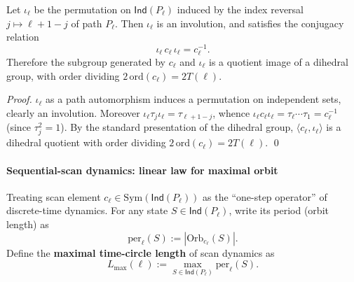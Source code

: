 \begin{corollary}\label{cor:pom-toggle-dihedral-time-reversal}
Let \(\iota_{\ell}\) be the permutation on \(\mathsf{Ind}(P_\ell)\) induced by the index reversal \(j\mapsto \ell+1-j\) of path \(P_{\ell}\).
Then \(\iota_{\ell}\) is an involution, and satisfies the conjugacy relation
\[
\iota_{\ell}\,c_{\ell}\,\iota_{\ell}=c_{\ell}^{-1}.
\]
Therefore the subgroup generated by \(c_\ell\) and \(\iota_\ell\) is a quotient image of a dihedral group, with order dividing \(2\,\mathrm{ord}(c_\ell)=2T(\ell)\).
\end{corollary}
\begin{proof}
\(\iota_\ell\) as a path automorphism induces a permutation on independent sets, clearly an involution.
Moreover \(\iota_\ell\tau_j\iota_\ell=\tau_{\ell+1-j}\), whence
\(
\iota_\ell c_\ell \iota_\ell
=\tau_\ell\cdots\tau_1
=c_\ell^{-1}
\)
(since \(\tau_j^2=1\)).
By the standard presentation of the dihedral group, \(\langle c_\ell,\iota_\ell\rangle\) is a dihedral quotient with order dividing \(2\,\mathrm{ord}(c_\ell)=2T(\ell)\). \qed
\end{proof}

\paragraph{Sequential-scan dynamics: linear law for maximal orbit}


\begin{definition}\label{def:pom-toggle-scan-max-orbit}
Treating scan element \(c_\ell\in\mathrm{Sym}(\mathsf{Ind}(P_\ell))\) as the ``one-step operator'' of discrete-time dynamics.
For any state \(S\in\mathsf{Ind}(P_\ell)\), write its period (orbit length) as
\[
\mathrm{per}_\ell(S):=|\mathrm{Orb}_{c_\ell}(S)|.
\]
Define the \textbf{maximal time-circle length} of scan dynamics as
\[
L_{\max}(\ell):=\max_{S\in\mathsf{Ind}(P_\ell)} \mathrm{per}_\ell(S).
\]
\end{definition}

